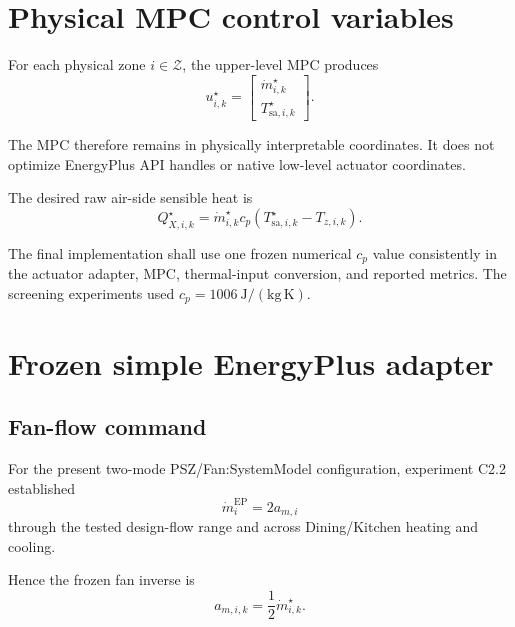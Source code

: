 \documentclass[11pt]{article}
\newcommand{\mdot}{\dot m}
\begin{document}
\section{Physical MPC control variables}

For each physical zone $i\in\mathcal Z$, the upper-level MPC produces
\begin{equation}
\boxed{
u_{i,k}^{\star}
=
\begin{bmatrix}
\mdot_{i,k}^{\star}\\
T_{\mathrm{sa},i,k}^{\star}
\end{bmatrix}.
}
\label{eq:physical-control}
\end{equation}

The MPC therefore remains in physically interpretable coordinates.  It does
not optimize EnergyPlus API handles or native low-level actuator coordinates.

The desired raw air-side sensible heat is
\begin{equation}
\boxed{
Q_{X,i,k}^{\star}
=
\mdot_{i,k}^{\star} c_p
\left(
T_{\mathrm{sa},i,k}^{\star}
-
T_{z,i,k}
\right).
}
\label{eq:qstar}
\end{equation}

The final implementation shall use one frozen numerical $c_p$ value
consistently in the actuator adapter, MPC, thermal-input conversion, and
reported metrics.  The screening experiments used
$c_p=1006~\mathrm{J/(kg\,K)}$.

\section{Frozen simple EnergyPlus adapter}

\subsection{Fan-flow command}

For the present two-mode PSZ/Fan:SystemModel configuration, experiment C2.2
established
\begin{equation}
\boxed{
\mdot_i^{\mathrm{EP}} = 2 a_{m,i}
}
\end{equation}
through the tested design-flow range and across Dining/Kitchen heating and
cooling.

Hence the frozen fan inverse is
\begin{equation}
\boxed{
a_{m,i,k}
=
\frac{1}{2}\mdot_{i,k}^{\star}.
}
\label{eq:fan-inverse}
\end{equation}
\end{document}
